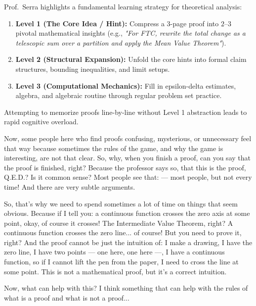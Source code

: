 \begin{didactic-insight}
Prof.\ Serra highlights a fundamental learning strategy for theoretical analysis:
\begin{enumerate}[label=\textbf{(\arabic*)}]
    \item \textbf{Level 1 (The Core Idea / Hint):} Compress a 3-page proof into $2$--$3$ pivotal mathematical insights (e.g., \emph{"For FTC, rewrite the total change as a telescopic sum over a partition and apply the Mean Value Theorem"}).
    \item \textbf{Level 2 (Structural Expansion):} Unfold the core hints into formal claim structures, bounding inequalities, and limit setups.
    \item \textbf{Level 3 (Computational Mechanics):} Fill in epsilon-delta estimates, algebra, and algebraic routine through regular problem set practice.
\end{enumerate}
Attempting to memorize proofs line-by-line without Level 1 abstraction leads to rapid cognitive overload.
\end{didactic-insight}

\begin{spoken-clean}[00:30:15 - 00:33:00]
Now, some people here who find proofs confusing, mysterious, or unnecessary feel that way because sometimes the rules of the game, and why the game is interesting, are not that clear. So, why, when you finish a proof, can you say that the proof is finished, right? Because the professor says so, that this is the proof, Q.E.D.? Is it common sense? Most people see that:  --- most people, but not every time! And there are very subtle arguments.

So, that's why we need to spend sometimes a lot of time on things that seem obvious. Because if I tell you: a continuous function crosses the zero axis at some point, okay, of course it crosses! The Intermediate Value Theorem, right? A continuous function crosses the zero line... of course! But you need to prove it, right? And the proof cannot be just the intuition of: I make a drawing, I have the zero line, I have two points --- one here, one here ---, I have a continuous function, so if I cannot lift the pen from the paper, I need to cross the line at some point. This is not a mathematical proof, but it's a correct intuition.

Now, what can help with this? I think something that can help with the rules of what is a proof and what is not a proof... 
\end{spoken-clean}

